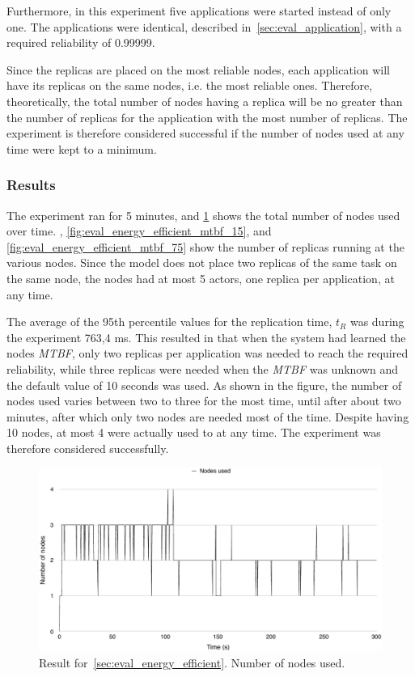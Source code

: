 \documentclass{cslthse-msc}
\begin{document}
Furthermore, in this experiment five applications were started instead of only one. The applications were identical, described in~\cref{sec:eval_application}, with a required reliability of 0.99999.

Since the replicas are placed on the most reliable nodes, each application will have its replicas on the same nodes, i.e. the most reliable ones. Therefore, theoretically, the total number of nodes having a replica will be no greater than the number of replicas for the application with the most number of replicas. The experiment is therefore considered successful if the number of nodes used at any time were kept to a minimum.

\subsubsection*{Results}
The experiment ran for 5 minutes, and \cref{fig:eval_energy_efficient_total} shows the total number of nodes used over time. , \cref{fig:eval_energy_efficient_mtbf_15}, and \cref{fig:eval_energy_efficient_mtbf_75} show the number of replicas running at the various nodes. Since the model does not place two replicas of the same task on the same node, the nodes had at most 5 actors, one replica per application, at any time.

The average of the 95th percentile values for the replication time, $t_R$ was during the experiment 763,4 ms. This resulted in that when the system had learned the nodes \emph{MTBF}, only two replicas per application was needed to reach the required reliability, while three replicas were needed when the \emph{MTBF} was unknown and the default value of 10 seconds was used. As shown in the figure, the number of nodes used varies between two to three for the most time, until after about two minutes, after which only two nodes are needed most of the time. Despite having 10 nodes, at most 4 were actually used to at any time. The experiment was therefore considered successfully.

\begin{figure}[!hbt]
\centering
\includegraphics[scale=0.5]{images/results/energy_efficient/total.pdf}
\caption[Total number of nodes used in~\cref{sec:eval_energy_efficient}]{Result for~\cref{sec:eval_energy_efficient}. Number of nodes used.} \label{fig:eval_energy_efficient_total}
\end{figure}
\end{document}
